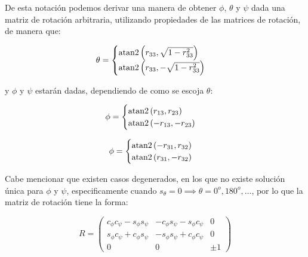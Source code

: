 \begin{multicols*}{2}
            \begin{center}
            \end{center}

            De esta notación podemos derivar una manera de obtener $\phi$, $\theta$ y $\psi$ dada una matriz de rotación arbitraria, utilizando propiedades de las matrices de rotación, de manera que:

            \begin{equation}
                \theta =
                \begin{cases}
                    \operatorname{atan2}{\left( r_{33}, \sqrt{1 - r_{33}^2} \right)} \\
                    \operatorname{atan2}{\left( r_{33}, -\sqrt{1 - r_{33}^2} \right)}
                \end{cases}
            \end{equation}

            y $\phi$ y $\psi$ estarán dadas, dependiendo de como se escoja $\theta$:

            \begin{equation}
                \phi =
                \begin{cases}
                    \operatorname{atan2}{(r_{13}, r_{23})} \\
                    \operatorname{atan2}{(-r_{13}, -r_{23})}
                \end{cases}
            \end{equation}

            \begin{equation}
                \phi =
                \begin{cases}
                    \operatorname{atan2}{(-r_{31}, r_{32})} \\
                    \operatorname{atan2}{(r_{31}, -r_{32})}
                \end{cases}
            \end{equation}

            Cabe mencionar que existen casos degenerados, en los que no existe solución única para $\phi$ y $\psi$, especificamente cuando $s_{\theta} = 0 \implies \theta = 0^o, 180^o, \dots$, por lo que la matriz de rotación tiene la forma:

            \begin{equation*}
                R =
                \begin{pmatrix}
                    c_{\phi} c_{\psi} - s_{\phi} s_{\psi} & - c_{\phi} s_{\psi} - s_{\phi} c_{\psi} & 0 \\
                    s_{\phi} c_{\psi} + c_{\phi} s_{\psi} & - s_{\phi} s_{\psi} + c_{\phi} c_{\psi} & 0 \\
                    0 & 0 & \pm 1
                \end{pmatrix}
            \end{equation*}


\end{multicols*}
